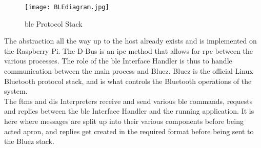 \begin{figure}[H]
	\begin{center}
		\texttt{[image: BLEdiagram.jpg]}
		\caption{\ac{ble} Protocol Stack}
		\label{fig:blez}
	\end{center}
\end{figure}

The abstraction all the way up to the host already exists and is implemented on the Raspberry Pi. The D-Bus is an \ac{ipc} method that allows for \ac{rpc} between the various processes. The role of the \ac{ble} Interface Handler is thus to handle communication between the main process and Bluez. Bluez is the official Linux Bluetooth protocol stack, and is what controls the Bluetooth operations of the system. \citep{Lee:2020}\\

The \ac{ftms} and \ac{dis} Interpreters receive and send various \ac{ble} commands, requests and replies between the \ac{ble} Interface Handler and the running application. It is here where messages are split up into their various components before being acted apron, and replies get created in the required format before being sent to the Bluez stack.
